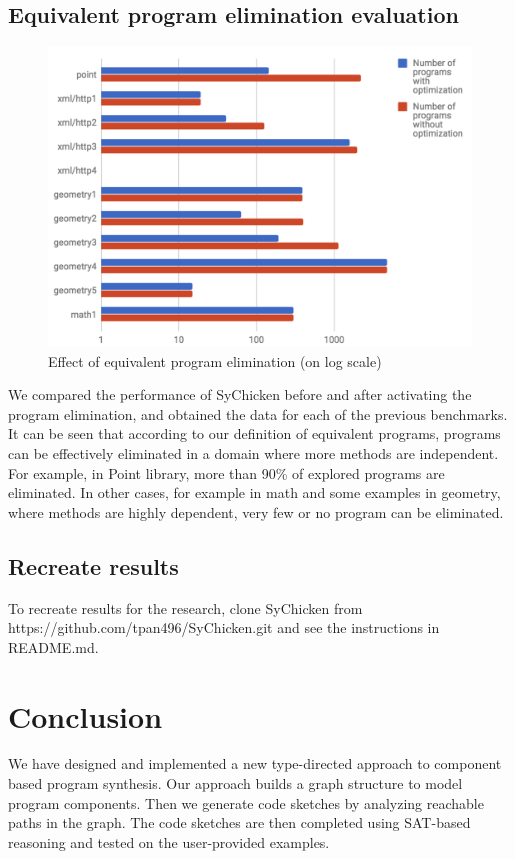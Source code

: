 \documentclass[twocolumn]{article}
\begin{document}
\subsection{Equivalent program elimination evaluation}
\begin{figure}[h]
  \includegraphics[width = \linewidth]{equivchart.png}
\caption{Effect of equivalent program elimination (on log scale)}
\end{figure}
We compared the performance of SyChicken before and after activating the program elimination, and obtained the data for each of the previous benchmarks.\\

It can be seen that according to our definition of equivalent programs, programs can be effectively eliminated in a domain where more methods are independent. For example, in Point library, more than 90\% of explored programs are eliminated. In other cases, for example in math and some examples in geometry, where methods are highly dependent, very few or no program can be eliminated.\\

\subsection{Recreate results}
To recreate results for the research, clone SyChicken from https://github.com/tpan496/SyChicken.git and see the instructions in README.md.
\section{Conclusion}
We have designed and implemented a new type-directed approach to component based program synthesis. Our approach builds a graph structure to model program components. Then we generate code sketches by analyzing reachable paths in the graph. The code sketches are then completed using SAT-based reasoning and tested on the user-provided examples.\\
\end{document}
